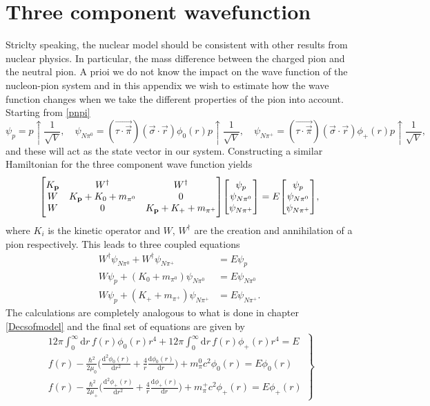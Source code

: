 \chapter{Three component wavefunction}\label{ThreeComponentWavefunction}
Striclty speaking, the nuclear model should be consistent with other results from nuclear physics. In particular, the mass difference between the charged pion and the neutral pion. A prioi we do not know the impact on the wave function of the nucleon-pion system and in this appendix we wish to estimate how the wave function changes when we take the different properties of the pion into account. Starting from \eqref{pnpi}
\begin{equation}\label{pnpipi}
    \psi_p = p\uparrow\frac{1}{\sqrt{V}}, \quad \psi_{N\pi^0}=(\vec{\tau\cdot\vec{\pi}})(\vec{\sigma}\cdot\vec{r})\phi_0(r) p\uparrow\frac{1}{\sqrt{V}}, \quad \psi_{N\pi^+}=(\vec{\tau\cdot\vec{\pi}})(\vec{\sigma}\cdot\vec{r})\phi_+(r) p\uparrow\frac{1}{\sqrt{V}},
\end{equation}
and these will act as the state vector in our system. Constructing a similar Hamiltonian for the three component wave function yields
\begin{equation}
    \mqty[K_{\vec{p}} & W^\dagger & W^\dagger \\ W & K_{\vec{p}}+K_0+m_{\pi^0} & 0 \\ W & 0 & K_{\vec{p}}+K_{+}+m_{\pi^+}]\mqty[\psi_p \\ \psi_{N\pi^0} \\ \psi_{N\pi^+}] = E \mqty[\psi_p \\ \psi_{N\pi^0} \\ \psi_{N\pi^+}],
\end{equation}
where $K_i$ is the kinetic operator and $W$, $W^\dagger$ are the creation and annihilation of a pion respectively. This leads to three coupled equations 
\begin{align}
W^\dagger \psi_{N\pi^0}+W^\dagger \psi_{N\pi^+} & = E\psi_p \\    
W\psi_p + (K_0+m_{\pi^0})\psi_{N\pi^0} &=E\psi_{N\pi^0} \\
W\psi_p + (K_{+}+m_{\pi^+})\psi_{N\pi^+}  & =E\psi_{N\pi^+}. 
\end{align}
The calculations are completely analogous to what is done in chapter \ref{Decsofmodel} and the final set of equations are given by
\begin{equation} \label{system3}
 \left.
    \begin{array}{ll}
            12\pi \int_0^\infty  \text{d}r \, f(r) \phi_0(r) r^4 + 12\pi \int_0^\infty  \text{d}r \, f(r) \phi_+(r) r^4 = E \\
            f(r) -\frac{\hbar^2}{2\mu_0}\Big(\frac{\text{d}^2 \phi_0(r)}{\text{d}r^2}+\frac{4}{r}\frac{\text{d}\phi_0(r)}{\text{d}r}\Big)+m_\pi^0 c^2 \phi_0(r) = E\phi_0(r) \\
            f(r) -\frac{\hbar^2}{2\mu_{+}}\Big(\frac{\text{d}^2 \phi_{+}(r)}{\text{d}r^2}+\frac{4}{r}\frac{\text{d}\phi_{+}(r)}{\text{d}r}\Big)+m_\pi^+ c^2 \phi_{+}(r) = E\phi_+(r)
    \end{array}
\right \} 
\end{equation}
